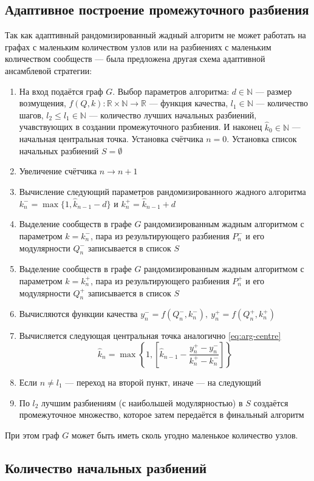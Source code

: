 
\subsection{Адаптивное построение промежуточного разбиения}

Так как адаптивный рандомизированный жадный алгоритм не может работать на графах с маленьким количеством узлов или на разбиениях с маленьким количеством сообществ --- была предложена другая схема адаптивной ансамблевой стратегии:

\begin{enumerate}
	\item На вход подаётся граф $G$. Выбор параметров алгоритма: $d \in \mathbb{N}$ --- размер возмущения, $f(Q, k): \mathbb{R} \times \mathbb{N} \rightarrow \mathbb{R}$ --- функция качества, $l_1 \in \mathbb{N}$ --- количество шагов, $l_2 \le l_1 \in \mathbb{N}$ --- количество лучших начальных разбиений, учавствующих в создании промежуточного разбиения. И наконец $\hat{k}_0 \in \mathbb{N}$ --- начальная центральная точка. Установка счётчика $n = 0$. Установка список начальных разбиений $S = \emptyset$
	\item Увеличение счётчика $n \rightarrow n + 1$
	\item Вычисление следующий параметров рандомизированного жадного алгоритма $k_n^{-} = \max\{1, \hat{k}_{n - 1} - d\}$ и $k_n^{+} = \hat{k}_{n - 1} + d$
	\item Выделение сообществ в графе $G$ рандомизированным жадным алгоритмом с параметром $k = k_n^{-}$, пара из результирующего разбиения $P_n^{-}$ и его модулярности $Q_n^{-}$ записывается в список $S$
	\item Выделение сообществ в графе $G$ рандомизированным жадным алгоритмом с параметром $k = k_n^{+}$, пара из результирующего разбиения $P_n^{+}$ и его модулярности $Q_n^{+}$ записывается в список $S$
	\item Вычисляются функции качества $y_n^{-} = f(Q_n^{-}, k_n^{-}),\ y_n^{+} = f(Q_n^{+}, k_n^{+})$
	\item Вычисляется следующая центральная точка аналогично \eqref{eq:arg-centre}
	\begin{equation}\label{eq:aes-centre}
		\hat{k}_n = \max\left\{1, \left[\hat{k}_{n - 1} - \frac{y_n^{+} - y_n^{-}}{k_n^{+} - k_n^{-}}\right]\right\}
	\end{equation}
	\item Если $n \ne l_1$ --- переход на второй пункт, иначе --- на следующий
	\item По $l_2$ лучшим разбиениям (с наибольшей модулярностью) в $S$ создаётся промежуточное множество, которое затем передаётся в финальный алгоритм
\end{enumerate}

При этом граф $G$ может быть иметь сколь угодно маленькое количество узлов.



\subsection{Количество начальных разбиений}

